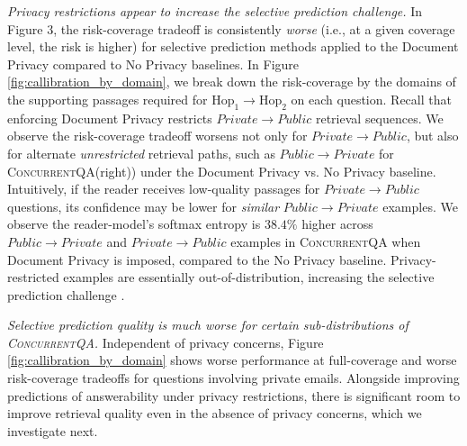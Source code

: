 \documentclass{article}
\renewcommand\cite{\citep}	\newcommand\shortcite{\citeyearpar}\newcommand\newcite{\citet}
\newcommand{\datasetname}{\textsc{ConcurrentQA}\xspace}
\begin{document}
\textit{Privacy restrictions appear to increase the selective prediction challenge.} In Figure $3$, the risk-coverage tradeoff is consistently \textit{worse} (i.e., at a given coverage level, the risk is higher) for selective prediction methods applied to the Document Privacy compared to No Privacy baselines. In Figure \ref{fig:callibration_by_domain}, we break down the risk-coverage by the domains of the supporting passages required for $\mathrm{Hop_1} \rightarrow \mathrm{Hop_2}$ on each question. Recall that enforcing Document Privacy restricts $Private \rightarrow Public$ retrieval sequences. We observe the risk-coverage tradeoff worsens not only for $Private \rightarrow Public$, but also for alternate \textit{unrestricted} retrieval paths, such as $Public \rightarrow Private$ for \datasetname (right)) under the Document Privacy vs. No Privacy baseline. Intuitively, if the reader receives low-quality passages for $Private \rightarrow Public$ questions, its confidence may be lower for \textit{similar} $Public \rightarrow Private$ examples. We observe the reader-model's softmax entropy is $38.4\%$ higher across $Public \rightarrow Private$ and $Private \rightarrow Public$ examples in \datasetname when Document Privacy is imposed, compared to the No Privacy baseline. Privacy-restricted examples are essentially out-of-distribution, increasing the selective prediction challenge \cite{kamath2020selectiveqa}.

\textit{Selective prediction quality is much worse for certain sub-distributions of \datasetname.} 
Independent of privacy concerns, Figure \ref{fig:callibration_by_domain} shows worse performance at full-coverage and worse risk-coverage tradeoffs for questions involving private emails. 
Alongside improving predictions of answerability under privacy restrictions, there is significant room to improve
retrieval quality even in the absence of privacy concerns, which we investigate next.
\end{document}
